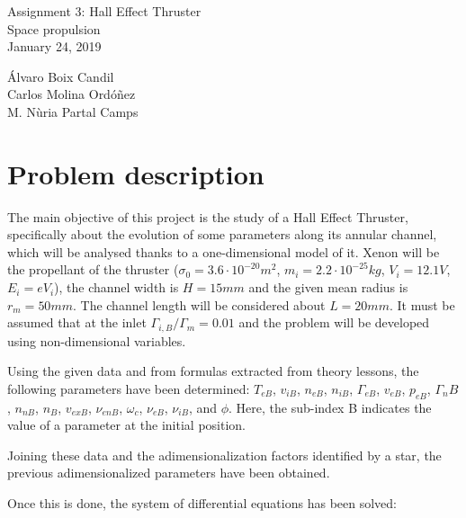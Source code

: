 \LARGE{Assignment 3:} \Large{Hall Effect Thruster}\\
\large{Space propulsion}\\
January 24, 2019
\begin{flushright}
\large{Álvaro Boix Candil}\\
\large{Carlos Molina Ordóñez}\\
\large{M. Nùria Partal Camps}\\
\end{flushright}

\section{Problem description}

The main objective of this project is the study of a Hall Effect Thruster,
specifically about the evolution of some parameters along its annular channel,
which will be analysed thanks to a one-dimensional model of it.
Xenon will be the propellant of the thruster
($\sigma_0 = 3.6 \cdot 10^{-20} m^2$, $m_i = 2.2\cdot 10^{-25} kg$, $V_i = 12.1 V$,
$E_i = eV_i$),
the channel width is $H = 15 mm$ and the given mean radius is $r_m = 50mm$. The
channel length will be considered about $L = 20 mm$. It must be assumed that at
the inlet $\Gamma_{i,B} / \Gamma_m = 0.01$ and the problem will be developed using non-dimensional
variables.

Using the given data and from formulas extracted from theory lessons, the following
parameters have been determined: $T_{eB}$, $v_{iB}$, $n_{eB}$, $n_{iB}$, $\Gamma_{eB}$,
$v_{eB}$, $p_{eB}$, $\Gamma_nB$, $n_{nB}$, $n_B$, $v_{exB}$, $\nu_{enB}$, $\omega_c$,
$\nu_{eB}$, $\nu_{iB}$, and $\phi$. Here, the sub-index B indicates the value of
a parameter at the initial position.

Joining these data and the adimensionalization factors identified by a star,
the previous adimensionalized parameters have been obtained.

Once this is done, the system of differential equations has been solved:

